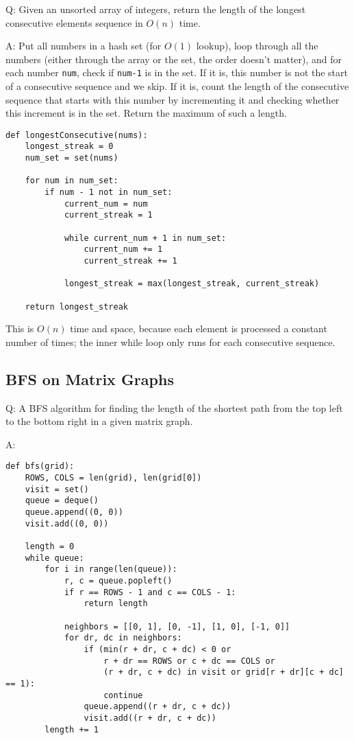 \documentclass[8pt, table, xcdraw]{article}%
\begin{document}
Q: Given an unsorted array of integers, return the length of the longest consecutive elements sequence in $O(n)$ time.

A: Put all numbers in a hash set (for $O(1)$ lookup), loop through all the numbers (either through the array or the set, the order doesn't matter), and for each number \lstinline{num}, check if \lstinline{num-1} is in the set. If it is, this number is not the start of a consecutive sequence and we skip. If it is, count the length of the consecutive sequence that starts with this number by incrementing it and checking whether this increment is in the set. Return the maximum of such a length.

\begin{lstlisting}
def longestConsecutive(nums):
    longest_streak = 0
    num_set = set(nums)

    for num in num_set:
        if num - 1 not in num_set:
            current_num = num
            current_streak = 1

            while current_num + 1 in num_set:
                current_num += 1
                current_streak += 1

            longest_streak = max(longest_streak, current_streak)

    return longest_streak
\end{lstlisting}

This is $O(n)$ time and space, because each element is processed a constant number of times; the inner while loop only runs for each consecutive sequence.

\subsection{BFS on Matrix Graphs}

Q: A BFS algorithm for finding the length of the shortest path from the top left to the bottom right in a given matrix graph.

A:

\begin{lstlisting}
def bfs(grid):
    ROWS, COLS = len(grid), len(grid[0])
    visit = set()
    queue = deque()
    queue.append((0, 0))
    visit.add((0, 0))

    length = 0
    while queue:
        for i in range(len(queue)):
            r, c = queue.popleft()
            if r == ROWS - 1 and c == COLS - 1:
                return length

            neighbors = [[0, 1], [0, -1], [1, 0], [-1, 0]]
            for dr, dc in neighbors:
                if (min(r + dr, c + dc) < 0 or
                    r + dr == ROWS or c + dc == COLS or
                    (r + dr, c + dc) in visit or grid[r + dr][c + dc] == 1):
                    continue
                queue.append((r + dr, c + dc))
                visit.add((r + dr, c + dc))
        length += 1
\end{lstlisting}
\end{document}
